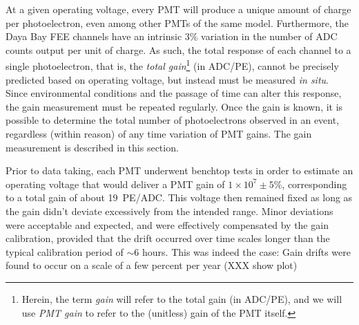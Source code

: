 \documentclass[../thesis.tex]{subfiles}
\begin{document}
At a given operating voltage, every PMT will produce a unique amount of charge per photoelectron, even among other PMTs of the same model. Furthermore, the Daya Bay FEE channels have an intrinsic 3\% variation in the number of ADC counts output per unit of charge. As such, the total response of each channel to a single photoelectron, that is, the \emph{total gain}\footnote{Herein, the term \emph{gain} will refer to the total gain (in ADC/PE), and we will use \emph{PMT gain} to refer to the (unitless) gain of the PMT itself.} (in ADC/PE), cannot be precisely predicted based on operating voltage, but instead must be measured \emph{in situ}. Since environmental conditions and the passage of time can alter this response, the gain measurement must be repeated regularly. Once the gain is known, it is possible to determine the total number of photoelectrons observed in an event, regardless (within reason) of any time variation of PMT gains. The gain measurement is described in this section.

Prior to data taking, each PMT underwent benchtop tests in order to estimate an operating voltage that would deliver a PMT gain of $1 \times 10^7 \pm 5\%$, corresponding to a total gain of about 19~PE/ADC. This voltage then remained fixed as long as the gain didn't deviate excessively from the intended range. Minor deviations were acceptable and expected, and were effectively compensated by the gain calibration, provided that the drift occurred over time scales longer than the typical calibration period of $\sim$6 hours. This was indeed the case: Gain drifts were found to occur on a scale of a few percent per year (XXX show plot) 
\end{document}
